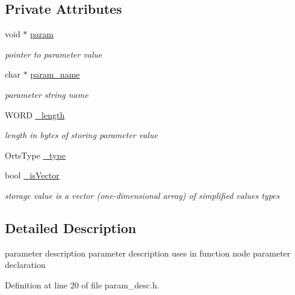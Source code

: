 \subsection*{Private Attributes}
\begin{DoxyCompactItemize}
\item 
void $\ast$ \hyperlink{classparam__desc_ab6c04ba17496b540d9e7c93e317bcc97}{param}
\begin{DoxyCompactList}\small\item\em pointer to parameter value \item\end{DoxyCompactList}\item 
char $\ast$ \hyperlink{classparam__desc_a23d2dc9553f6973dba3dd0f52695a25f}{param\_\-name}
\begin{DoxyCompactList}\small\item\em parameter string name \item\end{DoxyCompactList}\item 
WORD \hyperlink{classparam__desc_a165a9b9dcf1b25db8ddfba546569c1d6}{\_\-length}
\begin{DoxyCompactList}\small\item\em length in bytes of storing parameter value \item\end{DoxyCompactList}\item 
OrtsType \hyperlink{classparam__desc_abb36e4e2c3695b95a6a757fdb1a7e329}{\_\-type}
\item 
bool \hyperlink{classparam__desc_ae7e4c24d35e3b990b53656ea964d77b5}{\_\-isVector}
\begin{DoxyCompactList}\small\item\em storage value is a vector (one-\/dimensional array) of simplified values types \item\end{DoxyCompactList}\end{DoxyCompactItemize}


\subsection{Detailed Description}
parameter description parameter description uses in function node parameter declaration 

Definition at line 20 of file param\_\-desc.h.



